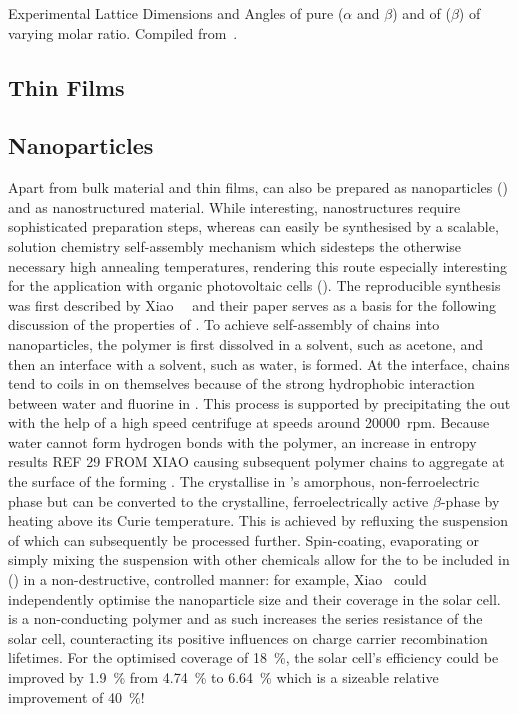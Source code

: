\begin{table}[]
\centering
\caption{Experimental Lattice Dimensions and Angles of pure \pvdf{} ($\alpha$ and $\beta$) and of \pvfe{} ($\beta$) of varying molar ratio. Compiled from~\cite[p.810]{encyclopedia}.}
\label{tab:pvdflat}

\end{table}
\subsection{\pvdf{} Thin Films}
\subsection{\pvdf{} Nanoparticles}
Apart from bulk material and thin films, \pvdf{} can also be prepared as nanoparticles (\nps{}) and as nanostructured material. While interesting, \pvdf{} nanostructures require sophisticated preparation steps, whereas \pvdf{} \nps{} can easily be synthesised by a scalable, solution chemistry self-assembly mechanism which sidesteps the otherwise necessary high annealing temperatures, rendering this route especially interesting for the application with organic photovoltaic cells (\opvs{}). The reproducible synthesis was first described by Xiao~\etal{}~\cite{NPsynthesis} and their paper serves as a basis for the following discussion of the properties of \pvdf{} \nps{}. To achieve self-assembly of \pvdf{} chains into nanoparticles, the polymer is first dissolved in a  solvent, such as acetone, and then an interface with a  solvent, such as water, is formed. At the interface, \pvdf{} chains tend to coils in on themselves because of the strong hydrophobic interaction between water and fluorine in \pvdf{}. This process is supported by precipitating the \nps{} out with the help of a high speed centrifuge at speeds around \SI{20000}{rpm}. Because water cannot form hydrogen bonds with the polymer, an increase in entropy results REF 29 FROM XIAO causing subsequent polymer chains to aggregate at the surface of the forming \np{}. The \nps{} crystallise in \pvdf{}'s amorphous, non-ferroelectric phase but can be converted to the crystalline, ferroelectrically  active $\beta$-phase by heating above its Curie temperature. This is achieved by refluxing the suspension of \nps{} which can subsequently be processed further. Spin-coating, evaporating or simply mixing the suspension with other chemicals allow for the \nps{} to be included in (\opvs{}) in a non-destructive, controlled manner: for example, Xiao~\etal{} could independently optimise the nanoparticle size and their coverage in the solar cell. \pvdf{} is a non-conducting polymer and as such increases the series resistance of the solar cell, counteracting its positive influences on charge carrier recombination lifetimes. For the optimised coverage of  \SI{18}{\percent}, the solar cell's efficiency could be improved by \SI{1.9}{\percent} from \SI{4.74}{\percent} to \SI{6.64}{\percent} which is a sizeable relative improvement of  \SI{40}{\percent}!

